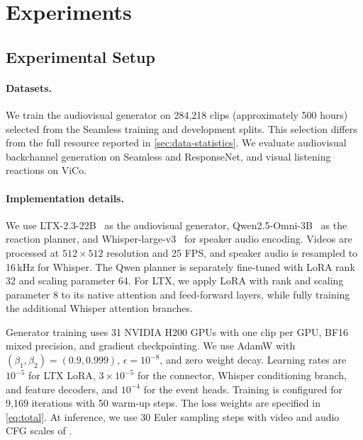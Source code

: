 \section{Experiments}
\label{sec:experiments}

\subsection{Experimental Setup}
\label{sec:setup}
\paragraph{Datasets.}
We train the audiovisual generator on 284,218 clips
(approximately 500 hours) selected from the Seamless
training and development splits. This selection differs
from the full resource reported in
\cref{sec:data-statistics}.
We evaluate audiovisual backchannel generation on
Seamless and ResponseNet, and visual listening reactions
on ViCo.

\paragraph{Implementation details.}
We use LTX-2.3-22B~\cite{ltx_pending} as the audiovisual
generator, Qwen2.5-Omni-3B~\cite{qwen25omni} as the reaction
planner, and Whisper-large-v3~\cite{whisper} for speaker
audio encoding. Videos are processed at $512\times512$
resolution and 25 FPS, and speaker audio is resampled to
16\,kHz for Whisper. The Qwen planner is separately
fine-tuned with LoRA rank 32 and scaling parameter 64.
For LTX, we apply LoRA with rank and scaling parameter 8
to its native attention and feed-forward layers, while
fully training the additional Whisper attention branches.

Generator training uses 31 NVIDIA H200 GPUs with one
clip per GPU, BF16 mixed precision, and gradient
checkpointing. We use AdamW with
$(\beta_1,\beta_2)=(0.9,0.999)$, $\epsilon=10^{-8}$,
and zero weight decay. Learning rates are $10^{-5}$
for LTX LoRA, $3\times10^{-5}$ for the connector,
Whisper conditioning branch, and feature decoders,
and $10^{-4}$ for the event heads. Training is configured
for 9,169 iterations with 50 warm-up steps.
The loss weights are specified in \cref{eq:total}.
At inference, we use 30 Euler sampling steps with
video and audio CFG scales of \pending.


